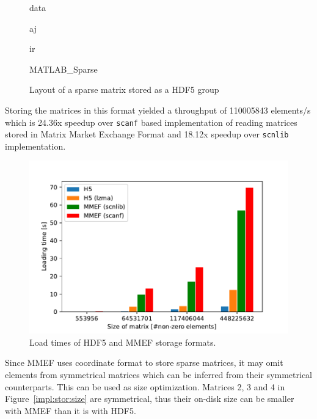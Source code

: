 \documentclass[thesis=M,english]{FITthesis}[2019/12/23]
\begin{document}
\begin{figure}[!h]
    \begin{tcolorbox}[title=/A, colback=gray!30!white]
        \begin{infobox}[colback=hdtsc]
            data
        \end{infobox}
        \begin{infobox}[colback=hdtsc]
            aj
        \end{infobox}
        \begin{infobox}[colback=hdtsc]
            ir
        \end{infobox}
        \begin{infobox}[colback=hdatc, width=0.35\textwidth]
            MATLAB\_Sparse
        \end{infobox}
    \end{tcolorbox}
    \caption{Layout of a sparse matrix stored as a HDF5 group}
\end{figure}

Storing the matrices in this format yielded a throughput of \num{110005843} elements/s which is 24.36x speedup
over \texttt{scanf} based implementation of reading matrices stored in Matrix Market Exchange Format
and 18.12x speedup over \texttt{scnlib} implementation.

\begin{figure}[htp]
    \centering
    \includegraphics[scale=0.65]{static/mmef_vs_h5.pdf}
    \caption{Load times of HDF5 and MMEF storage formats.}\label{impl:stor:speed}
\end{figure}


Since MMEF uses coordinate format to store sparse matrices, it may omit elements from symmetrical matrices which can be inferred
from their symmetrical counterparts. This can be used as size optimization. Matrices 2, 3 and 4 in Figure~\ref{impl:stor:size}
are symmetrical, thus their on-disk size can be smaller with MMEF than it is with HDF5.
\end{document}
